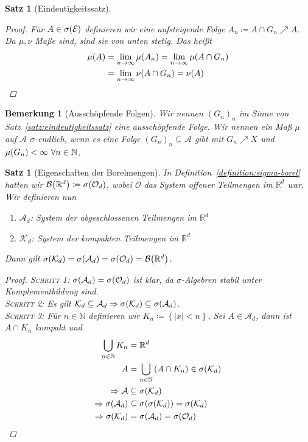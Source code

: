 \documentclass[11pt, twoside, a4paper]{article}
\theoremstyle{plain}
\newtheorem{bemerkung}[blockelement]{Bemerkung}
\newtheorem{satz}[blockelement]{Satz}
\numberwithin{equation}{subsection}
\newcommand{\set}[1]{\left\{#1\right\}}
\newcommand{\pair}[1]{\left(#1\right)}
\newcommand{\of}[1]{\mathopen{}\mathclose{}\bgroup\left(#1\aftergroup\egroup\right)}
\newcommand{\abs}[1]{\left\lvert#1\right\rvert}
\newcommand{\impl}[0]{\Rightarrow{}}
\newcommand{\toinf}{\to\infty}
\newcommand{\R}{\mathbb{R}}
\newcommand{\N}{\mathbb{N}}
\newcommand{\mA}{\mathcal{A}}
\newcommand{\mB}{\mathcal{B}}
\newcommand{\mE}{\mathcal{E}}
\newcommand{\mK}{\mathcal{K}}
\newcommand{\mO}{\mathcal{O}}
\begin{document}
\begin{satz}[Eindeutigkeitssatz]
\begin{proof}
            Für $A\in \sigma\of{\mE}$ definieren wir eine aufsteigende Folge $A_n \coloneqq A \cap G_n \nearrow A$. Da $\mu, \nu$ Maße sind, sind sie von unten stetig. Das heißt
            \begin{align*}
                \mu\of{A} &= \lim_{n\toinf} \mu\of{A_n} = \lim_{n\toinf} \mu\of{A \cap G_n}\\
                &= \lim_{n\toinf} \nu\of{A \cap G_n} = \nu\of{A}\qedhere
            \end{align*}
        \end{proof}
    \end{satz}

    \begin{bemerkung}[Ausschöpfende Folgen]
        Wir nennen $(G_n)_n$ im Sinne von Satz~\ref{satz:eindeutigkeitssatz} eine ausschöpfende Folge. Wir nennen ein Maß $\mu$ auf $\mA$ $\sigma$-endlich, wenn es eine Folge $(G_n)_n \subseteq \mA$ gibt mit $G_n \nearrow X$ und $\mu\of{G_n} < \infty~\forall n\in\N$.
    \end{bemerkung}

    \begin{satz}[Eigenschaften der Borelmengen]
        In Definition~\ref{definition:sigma-borel} hatten wir $\mB\of{\R^d} \coloneqq \sigma\of{\mO_d}$, wobei $\mO$ das System offener Teilmengen im $\R^d$ war. Wir definieren nun
        \begin{enumerate}[label=-]
            \item $\mA_d$: System der abgeschlossenen Teilmengen im $\R^d$
            \item $\mK_d$: System der kompakten Teilmengen im $\R^d$
        \end{enumerate}
        Dann gilt $\sigma\of{\mK_d} = \sigma\of{\mA_d} = \sigma\of{\mO_d} = \mB\of{\R^d}$.
        \begin{proof}
            \textsc{Schritt 1}: $\sigma\of{\mA_d} = \sigma\of{\mO_d}$ ist klar, da $\sigma$-Algebren stabil unter Komplementbildung sind.\\
            \textsc{Schritt 2}: Es gilt $\mK_d \subseteq \mA_d \impl \sigma\of{\mK_d} \subseteq \sigma\of{\mA_d}$.\\
            \textsc{Schritt 3}: Für $n\in\N$ definieren wir $K_n \coloneqq \set{\abs{x} < n}$. Sei $A \in \mA_d$, dann ist $A\cap K_n$ kompakt und
            \begin{align*}
                \bigcup_{n\in\N} K_n &= \R^d\\
                A &= \bigcup_{n\in\N} \pair{A \cap K_n} \in \sigma\of{\mK_d}\\
                \impl \mA &\subseteq \sigma\of{\mK_d}\\
                \impl \sigma\of{\mA_d} &\subseteq \sigma\of{\sigma\of{\mK_d}} = \sigma\of{\mK_d}\\
                \impl \sigma\of{\mK_d} &= \sigma\of{\mA_d} = \sigma\of{\mO_d}\qedhere
            \end{align*}
        \end{proof}
    \end{satz}
\end{document}
